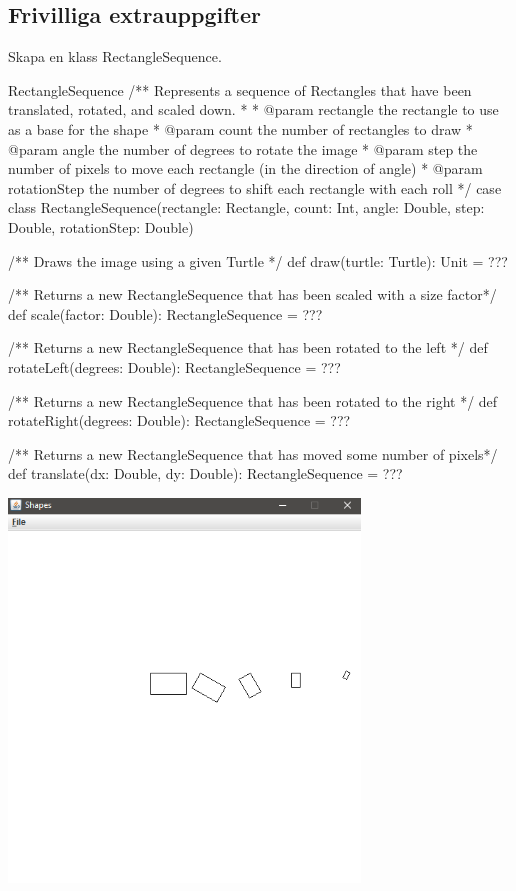 \subsection{Frivilliga extrauppgifter}


\Task Skapa en klass RectangleSequence.


\begin{ScalaSpec}{RectangleSequence}
/** Represents a sequence of Rectangles that have been translated,
    rotated, and scaled down.
  *
  * @param rectangle        the rectangle to use as a base for the shape
  * @param count            the number of rectangles to draw
  * @param angle            the number of degrees to rotate the image
  * @param step             the number of pixels to move each rectangle
                            (in the direction of angle)
  * @param rotationStep     the number of degrees to shift each rectangle
                            with each roll
  */
case class RectangleSequence(rectangle: Rectangle,
                             count: Int,
                             angle: Double,
                             step: Double,
                             rotationStep: Double) {

  /** Draws the image using a given Turtle */
  def draw(turtle: Turtle): Unit = ???

  /** Returns a new RectangleSequence that has been scaled with a size factor*/
  def scale(factor: Double): RectangleSequence = ???

  /** Returns a new RectangleSequence that has been rotated to the left */
  def rotateLeft(degrees: Double): RectangleSequence = ???

  /** Returns a new RectangleSequence that has been rotated to the right */
  def rotateRight(degrees: Double): RectangleSequence = ???

  /** Returns a new RectangleSequence that has moved some number of pixels*/
  def translate(dx: Double, dy: Double): RectangleSequence = ???
}
\end{ScalaSpec}

\includegraphics[width=0.7\textwidth]{../img/w06-lab/RollingRectangle.png}




